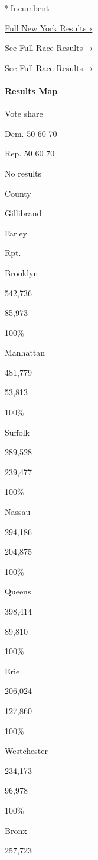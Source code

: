 * Incumbent

\href{https://www.nytimes3xbfgragh.onion/interactive/2018/11/06/us/elections/results-new-york-elections.html}{Full
New York Results ›}

\href{https://www.nytimes3xbfgragh.onion/elections/results/new-york-senate}{See
Full Race Results~ ›}

\href{https://www.nytimes3xbfgragh.onion/elections/results/new-york-senate}{See
Full Race Results~ ›}

\hypertarget{results-map}{%
\paragraph{Results Map}\label{results-map}}

Vote share

Dem. 50 60 70

Rep. 50 60 70

No results

County

Gillibrand

Farley

Rpt.

Brooklyn

542,736

85,973

100\%

Manhattan

481,779

53,813

100\%

Suffolk

289,528

239,477

100\%

Nassau

294,186

204,875

100\%

Queens

398,414

89,810

100\%

Erie

206,024

127,860

100\%

Westchester

234,173

96,978

100\%

Bronx

257,723

